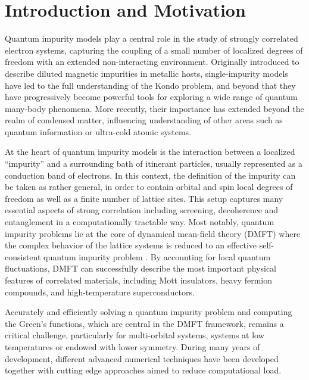 \documentclass[edipack_sp.tex]{subfiles}
\begin{document}

\section{Introduction and Motivation}\label{SecIntro}
Quantum impurity models play a central role in the study of strongly correlated electron systems, capturing the coupling of a small number of localized degrees of freedom with an extended non-interacting environment.   
Originally introduced to describe diluted magnetic impurities in metallic hosts, single-impurity models have led to the full understanding of the Kondo problem, and beyond that they have progressively become powerful tools for exploring a wide range of quantum many-body phenomena. More recently, their importance has extended beyond the realm of condensed matter, influencing understanding of other areas such as quantum information or ultra-cold atomic systems.

At the heart of quantum impurity models is the interaction between a localized ``impurity''  and a surrounding bath of itinerant particles, usually represented as a conduction band of electrons. In this context, the definition of the impurity can be taken as rather general, in order to contain orbital and spin local degrees of freedom as well as a finite number of lattice sites. %
This setup captures many essential aspects of strong correlation including screening, decoherence and entanglement in a computationally tractable way. 
Most notably, quantum impurity problems lie at the core of dynamical mean-field theory (DMFT) where the complex behavior of the lattice systems is reduced to an effective self-consistent quantum impurity problem \cite{Georges1996RMP}.  
By accounting for local quantum fluctuations, DMFT can successfully describe the most important physical features of correlated materials, including Mott insulators, heavy fermion compounds, and high-temperature superconductors.  

Accurately and efficiently solving a quantum impurity problem and computing the Green's functions, which are central in the DMFT framework, remains a
critical challenge, particularly for multi-orbital systems, systems
at low temperatures or endowed with lower symmetry. During many years of development, different advanced numerical techniques have been developed together with cutting edge approaches aimed to reduce computational load.  
\end{document}
